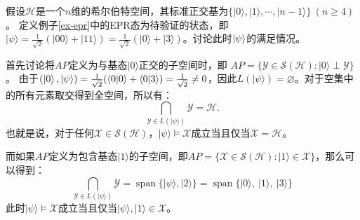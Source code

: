 \begin{example}
    假设$\mathcal{H}$是一个$n$维的希尔伯特空间，其标准正交基为$\{|0\rangle, |1\rangle, \cdots, |n - 1\rangle\}\ (n \geq 4)$。
    定义例子\ref{ex-epr}中的EPR态为待验证的状态，即$|\psi\rangle = \frac{1}{\sqrt{2}}(|00\rangle + |11\rangle)= \frac{1}{\sqrt{2}}(|0\rangle + |3\rangle)$。讨论此时\(\ket{\psi}\)的满足情况。
    
    首先讨论将$AP$定义为与基态$|0\rangle$正交的子空间时，即
    $AP = \{\mathcal{Y} \in \mathcal{S}(\mathcal{H}) : |0\rangle \perp \mathcal{Y}\}$。
    由于$(\ket{0},\ket{\psi}) = \frac{1}{\sqrt{2}}(\langle 0|0\rangle + \langle 0|3\rangle) = \frac{1}{\sqrt{2}} \neq 0$，因此$L(|\psi\rangle) = \varnothing$。对于空集中的所有元素取交得到全空间，所以有：
    \begin{equation}
    {\bigcap_{\mathcal{Y} \in L(|\psi\rangle)} \mathcal{Y} = \mathcal{H}.}
    \end{equation}
    也就是说，对于任何$\mathcal{X} \in \mathcal{S}(\mathcal{H})$，$|\psi\rangle \models \mathcal{X}$成立当且仅当$\mathcal{X} = \mathcal{H}$。
    
    
    而如果$AP$定义为包含基态$|1\rangle$的子空间，即$AP = \{\mathcal{X} \in \mathcal{S}(\mathcal{H}) : |1\rangle \in \mathcal{X}\}$，那么可以得到：
    \begin{equation}
        {\bigcap_{\mathcal{Y} \in L(|\psi\rangle)} \mathcal{Y} = \operatorname{span}\{|\psi\rangle, |2\rangle}\} = \operatorname{span}\{|0\rangle,\ |1\rangle,\ |3\rangle\}
    \end{equation}
    此时$|\psi\rangle \models \mathcal{X}$成立当且仅当$|\psi\rangle,|1\rangle \in \mathcal{X}$。
\end{example}


